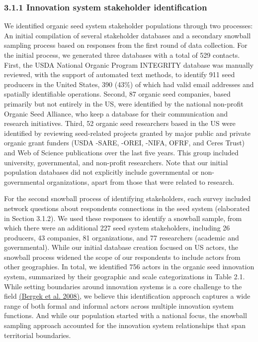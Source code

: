 \documentclass[twoside,12pt,final]{ucthesis-CA2012}
\begin{document}
\begin{ucmainmatter}
\hypertarget{innovation-system-stakeholder-identification}{%
\subsubsection{3.1.1 Innovation system stakeholder identification}\label{innovation-system-stakeholder-identification}}

We identified organic seed system stakeholder populations through two
processes: An initial compilation of several stakeholder databases and a
secondary snowball sampling process based on responses from the first
round of data collection. For the initial process, we generated three
databases with a total of 529 contacts. First, the USDA National Organic
Program INTEGRITY database was manually reviewed, with the support of
automated text methods, to identify 911 seed producers in the United
States, 390 (43\%) of which had valid email addresses and spatially
identifiable operations. Second, 87 organic seed companies, based
primarily but not entirely in the US, were identified by the national
non-profit Organic Seed Alliance, who keep a database for their
communication and research initiatives. Third, 52 organic seed
researchers based in the US were identified by reviewing seed-related
projects granted by major public and private organic grant funders (USDA
-SARE, -OREI, -NIFA, OFRF, and Ceres Trust) and Web of Science
publications over the last five years. This group included university,
governmental, and non-profit researchers. Note that our initial
population databases did not explicitly include governmental or
non-governmental organizations, apart from those that were related to
research.

For the second snowball process of identifying stakeholders, each survey
included network questions about respondents\textquotesingle{} connections in the seed
system (elaborated in Section 3.1.2). We used these responses to
identify a snowball sample, from which there were an additional 227 seed
system stakeholders, including 26 producers, 43 companies, 81
organizations, and 77 researchers (academic and governmental). While our
initial database creation focused on US actors, the snowball process
widened the scope of our respondents to include actors from other
geographies. In total, we identified 756 actors in the organic seed
innovation system, summarized by their geographic and scale
categorizations in Table 2.1. While setting boundaries around innovation
systems is a core challenge to the field \href{https://www.zotero.org/google-docs/?QRnDO8}{(Bergek et al.
2008)}, we believe this
identification approach captures a wide range of both formal and
informal actors across multiple innovation system functions. And while
our population started with a national focus, the snowball sampling
approach accounted for the innovation system relationships that span
territorial boundaries.


\end{ucmainmatter}
\end{document}

